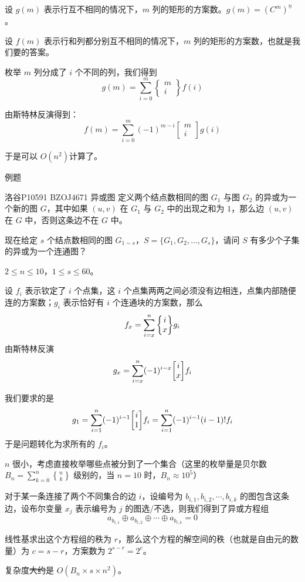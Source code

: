 \documentclass[UTF8]{beamer}
\begin{document}
    \begin{frame}
        
    设 $g(m)$ 表示行互不相同的情况下，$m$ 列的矩形的方案数。$g(m)=(C^m)^{\underline{n}}$。

    设 $f(m)$ 表示行和列都分别互不相同的情况下，$m$ 列的矩形的方案数，也就是我们要的答案。

    枚举 $m$ 列分成了 $i$ 个不同的列，我们得到
    $$
    g(m)=\sum\limits_{i=0}^m\begin{Bmatrix}m\\i \end{Bmatrix}f(i)
    $$

    由斯特林反演得到：
    $$
    f(m)=\sum\limits_{i=0}^m(-1)^{m-i}\begin{bmatrix}m\\i \end{bmatrix}g(i)
    $$

    于是可以 $O(n^2)$计算了。
    \end{frame}
    \begin{frame}{例题}
        \begin{block}{洛谷P10591 BZOJ4671 异或图}
        定义两个结点数相同的图 $G_1$ 与图 $G_2$ 的异或为一个新的图 $G$，其中如果 $(u,v)$ 在 $G_1$ 与 $G_2$ 中的出现之和为 $1$，那么边 $(u,v)$ 在 $G$ 中，否则这条边不在 $G$ 中。

        现在给定 $s$ 个结点数相同的图 $G_{1\sim s}$，$S=\{G_1,G_2,\dots,G_s\}$，请问 $S$ 有多少个子集的异或为一个连通图？

        $2\leq n\leq 10$，$1\leq s\leq 60$。
        \end{block}
        \pause

        设 $f_i$ 表示钦定了 $i$ 个点集，这 $i$ 个点集两两之间必须没有边相连，点集内部随便连的方案数；$g_i$ 表示恰好有 $i$ 个连通块的方案数，那么
        $$
        f_x=\sum_{i=x}^n \St ix g_i
        $$
        由斯特林反演
        $$
        g_x = \sum_{i=x}^n(-1)^{i-x}\st ix f_i
        $$
    \end{frame}
    \begin{frame}
        我们要求的是
        $$
        g_1=\sum_{i=1}^n(-1)^{i-1}\st i1 f_i = \sum_{i=1}^n (-1)^{i-1}(i-1)!f_i
        $$
        于是问题转化为求所有的 $f_i$。

        \pause

        $n$ 很小，考虑直接枚举哪些点被分到了一个集合（这里的枚举量是贝尔数 $B_n = \sum_{k=0}^n{n \brace k}$ 级别的，当 $n=10$ 时，$B_n\approx 10^5$）

        对于某一条连接了两个不同集合的边 $i$，设编号为 $b_{i,1},b_{i,2},\cdots, b_{i,k}$ 的图包含这条边，设布尔变量 $x_j$ 表示编号为 $j$ 的图选/不选，则我们得到了异或方程组
        $$
        a_{b_{i,1}}\oplus a_{b_{i,2}}\oplus\cdots\oplus a_{b_{i,k}} = 0
        $$

        线性基求出这个方程组的秩为 $r$，那么这个方程的解空间的秩（也就是自由元的数量）为 $c=s-r$，方案数为 $2^{s-r}=2^c$。

        复杂度\sout{大约}是 $O(B_n\times s\times n^2)$。
    \end{frame}
\end{document}
